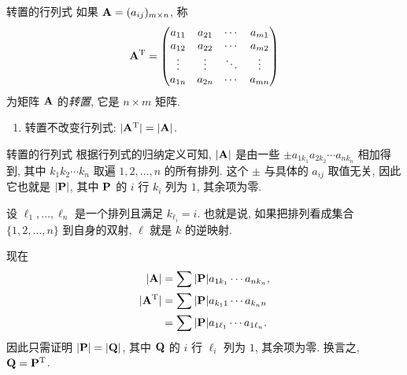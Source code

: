 \begin{frame}{转置的行列式}
	\onslide<+->
	如果 ${\mathbf{A}}=(a_{ij})_{m\times n}$, 称
	\[{\mathbf{A}}^{\mathrm{T}}=\begin{pmatrix}
		a_{11}&a_{21}&\cdots&a_{m1}\\
		a_{12}&a_{22}&\cdots&a_{m2}\\
		\vdots&\vdots&\ddots&\vdots\\
		a_{1n}&a_{2n}&\cdots&a_{mn}
	\end{pmatrix}\]
	为矩阵 ${\mathbf{A}}$ 的\emph{转置}, 它是 $n\times m$ 矩阵.
	\begin{alertblock@}
		\begin{enumerate}
			\item 转置不改变行列式: $|{\mathbf{A}}^{\mathrm{T}}|=|{\mathbf{A}}|$.
		\end{enumerate}
	\end{alertblock@}
\end{frame}


\begin{frame}{转置的行列式}
	\onslide<+->
	根据行列式的归纳定义可知, $|{\mathbf{A}}|$ 是由一些 $\pm a_{1 k_1}a_{2 k_2}\cdots a_{n k_n}$ 相加得到, 其中 $k_1 k_2 \cdots k_n$ 取遍 $1,2,\dots,n$ 的所有排列.
	\onslide<+->
	这个 $\pm$ 与具体的 $a_{ij}$ 取值无关, 因此它也就是 $|{\mathbf{P}}|$, 其中 ${\mathbf{P}}$ 的 $i$ 行 $k_i$ 列为 $1$, 其余项为零.

	\onslide<+->
	设 $\ell_1,\dots,\ell_n$ 是一个排列且满足 $k_{\ell_i}=i$.
	\onslide<+->
	也就是说, 如果把排列看成集合 $\{1,2,\dots,n\}$ 到自身的双射, $\ell$ 就是 $k$ 的逆映射.

	\onslide<+->
	现在
	\begin{align*}
		|{\mathbf{A}}|&=\sum|{\mathbf{P}}| a_{1k_1}\cdots a_{nk_n},\\
		|{\mathbf{A}}^{\mathrm{T}}|&=\sum|{\mathbf{P}}| a_{k_1 1}\cdots a_{k_n n}\\
		&=\sum|{\mathbf{P}}| a_{1\ell_1}\cdots a_{1 \ell_n}.
	\end{align*}
	\onslide<+->
	因此只需证明 $|{\mathbf{P}}|=|{\mathbf{Q}}|$, 其中 ${\mathbf{Q}}$ 的 $i$ 行 $\ell_i$ 列为 $1$, 其余项为零.
	\onslide<+->
	换言之, ${\mathbf{Q}}={\mathbf{P}}^{\mathrm{T}}$.
\end{frame}




